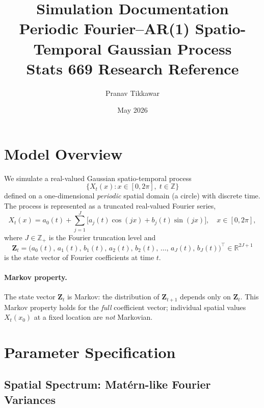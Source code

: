 \documentclass[12pt]{article}
\title{\textbf{Simulation Documentation} \\
\large Periodic Fourier--AR(1) Spatio-Temporal Gaussian Process \\
\normalsize Stats 669 Research Reference}
\author{Pranav Tikkawar}
\date{May 2026}
\begin{document}
\maketitle
\tableofcontents
\newpage

\section{Model Overview}

We simulate a real-valued Gaussian spatio-temporal process
\[
  \{ X_t(x) : x \in [0, 2\pi],\; t \in \mathbb{Z} \}
\]
defined on a one-dimensional \emph{periodic} spatial domain (a circle) with discrete time. The
process is represented as a truncated real-valued Fourier series,
\begin{equation}
  X_t(x) = a_0(t) + \sum_{j=1}^{J} \bigl[ a_j(t)\cos(jx) + b_j(t)\sin(jx) \bigr],
  \quad x \in [0, 2\pi],
  \label{eq:Xt}
\end{equation}
where $J \in \mathbb{Z}_+$ is the Fourier truncation level and
\[
  \mathbf{Z}_t = \bigl(a_0(t),\, a_1(t),\, b_1(t),\, a_2(t),\, b_2(t),\,\ldots,\, a_J(t),\, b_J(t)\bigr)^\top \in \mathbb{R}^{2J+1}
\]
is the state vector of Fourier coefficients at time $t$.

\paragraph{Markov property.}
The state vector $\mathbf{Z}_t$ is Markov: the distribution of $\mathbf{Z}_{t+1}$ depends only on
$\mathbf{Z}_t$. This Markov property holds for the \emph{full} coefficient vector; individual
spatial values $X_t(x_0)$ at a fixed location are \emph{not} Markovian.

\section{Parameter Specification}

\subsection{Spatial Spectrum: Mat\'{e}rn-like Fourier Variances}
\end{document}
